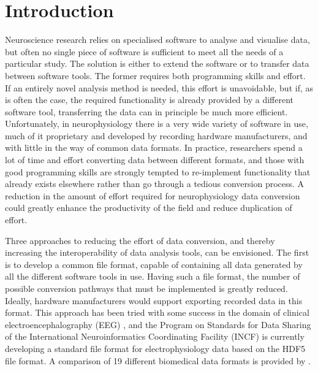 \documentclass{frontiers}
\begin{document}
\section{Introduction}



Neuroscience research relies on specialised software to analyse and visualise data, but often no single piece of software is sufficient to meet all the needs of a particular study.
The solution is either to extend the software or to transfer data between software tools.
The former requires both programming skills and effort.
If an entirely novel analysis method is needed, this effort is unavoidable, but if, as is often the case, the required functionality is already provided by a different software tool, transferring the data can in principle be much more efficient.
Unfortunately, in neurophysiology there is a very wide variety of software in use, much of it proprietary and developed by recording hardware manufacturers, and with little in the way of common data formats.
In practice, researchers spend a lot of time and effort converting data between different formats, and those with good programming skills are strongly tempted to re-implement functionality that already exists elsewhere rather than go through a tedious conversion process.
A reduction in the amount of effort required for neurophysiology data conversion could greatly enhance the productivity of the field and reduce duplication of effort. 

Three approaches to reducing the effort of data conversion, and thereby increasing the interoperability of data analysis tools, can be envisioned.
The first is to develop a common file format, capable of containing all data generated by all the different software tools in use.
Having such a file format, the number of possible conversion pathways that must be implemented is greatly reduced.
Ideally, hardware manufacturers would support exporting recorded data in this format.
This approach has been tried with some success in the domain of clinical electroencephalography (EEG) \citep{Kemp1992, Kemp2003, Schoegl2006}, and the Program on Standards for Data Sharing of the International Neuroinformatics Coordinating Facility (INCF) is currently developing a standard file format for electrophysiology data \citep{Teeters2013} based on the HDF5 file format. A comparison of 19 different biomedical data formats is provided by \citet{Schloegl2010}.
\end{document}

